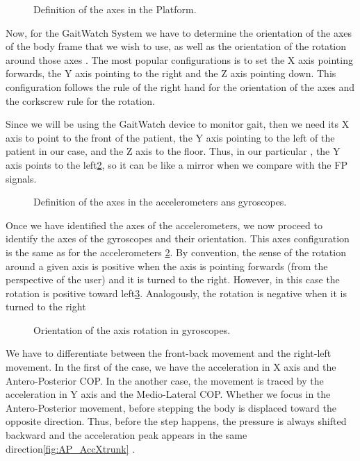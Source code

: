 \begin{figure}[H]
	\centering
	\caption{Definition of the axes in the Platform.}
	\label{fig:axesFP}
\end{figure}

Now, for the GaitWatch System we have to determine the orientation of the axes of the body frame that we wish to use, as well as the orientation of the rotation around those axes . The most popular configurations is to set the X axis pointing forwards, the Y axis pointing to the right and the Z axis pointing down. This configuration follows the rule of the right hand for the orientation of the axes and the corkscrew rule for the rotation. \cite{OlivaresBotzel2013}

Since we will be using the GaitWatch device to monitor gait, then we need its X axis to point to the front of the patient, the Y axis pointing to the left  of the patient in our case, and the Z axis to the floor. Thus, in our particular , the Y axis points to the left\ref{fig:axesGW}, so it can be like a mirror when we compare with the FP signals.\cite{OlivaresBotzel2013}

\begin{figure}[H]
	\centering
	\caption{Definition of the axes in the accelerometers ans gyroscopes.}
	\label{fig:axesGW}
\end{figure}

Once we have identified the axes of the accelerometers, we now proceed to identify the axes of the gyroscopes and their orientation. This axes configuration is the same as for the accelerometers \ref{fig:axesGW}. By convention, the sense of the rotation around a given axis is positive when the axis is pointing forwards (from the perspective of the user) and it is turned to the right. However, in this case the rotation is positive toward left\ref{fig:axesGWGyro}. Analogously, the rotation is negative when it is turned to the right \cite{OlivaresBotzel2013Mancini2009}

\begin{figure}[H]
	\centering
	\caption{Orientation of the axis rotation in gyroscopes.}
	\label{fig:axesGWGyro}
\end{figure}


We have to differentiate between the front-back movement and the right-left movement. In the first of the case, we have the acceleration in X axis and the Antero-Posterior COP. In the another case, the movement is traced by the acceleration in Y axis and the Medio-Lateral  COP.
Whether we focus in the Antero-Posterior movement, before stepping the body is displaced toward the opposite direction. Thus, before the step happens, the pressure is always shifted backward and the acceleration peak appears in the same direction\ref{fig:AP_AccXtrunk} .

